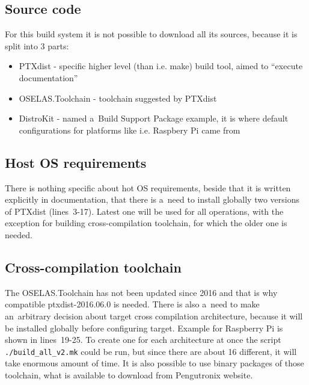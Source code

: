 \documentclass[printmode]{mgr}
\begin{document}



\subsection*{Source code}

For this build system it is not possible to download all its sources, because it is split into 3 parts:

\begin{itemize}
    \item PTXdist - specific higher level (than i.e. make) build tool, aimed to ``execute documentation''
    \item OSELAS.Toolchain - toolchain suggested by PTXdist
    \item DistroKit - named a~Build Support Package example, it is where default configurations for platforms like i.e. Raspbery Pi came from
\end{itemize}

\subsection*{Host OS requirements}

There is nothing specific about hot OS requirements, beside that it is written explicitly in documentation, that there is a~need to install globally two versions of PTXdist (lines~3-17).
Latest one will be used for all operations, with the exception for building cross-compilation toolchain, for which the older one is needed.

\subsection*{Cross-compilation toolchain}

The OSELAS.Toolchain has not been updated since 2016 and that is why compatible ptxdist-2016.06.0 is needed.
There is also a~need to make an~arbitrary decision about target cross compilation architecture, because it will be installed globally before configuring target.
Example for Raspberry Pi is shown in lines~19-25.
To create one for each architecture at once the script \verb|./build_all_v2.mk| could be run, but since there are about 16 different, it will take enormous amount of time.
It is also possible to use binary packages of those toolchain, what is available to download from Pengutronix website.
\end{document}
